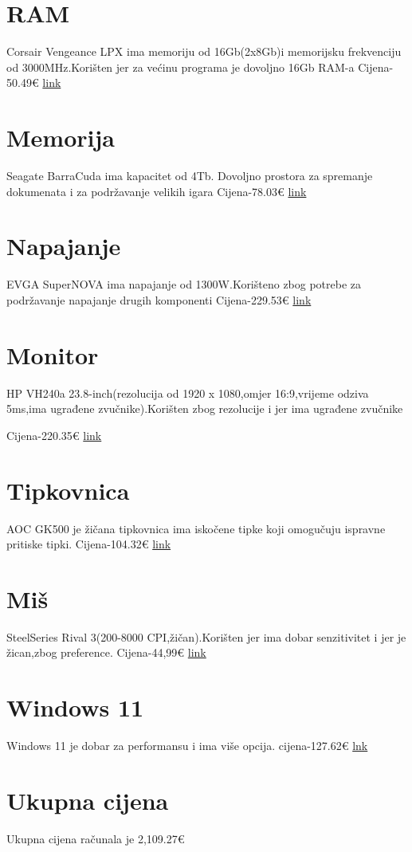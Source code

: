 \documentclass{article}
\begin{document}
\section{\huge{RAM}}
Corsair Vengeance LPX ima memoriju od 16Gb(2x8Gb)i memorijsku frekvenciju od 3000MHz.Korišten jer za većinu programa je dovoljno 16Gb RAM-a
Cijena-50.49€
\href{https://www.corsair.com/eu/en/p/memory/cmk16gx4m2b3200c16/vengeancea-lpx-16gb-2-x-8gb-ddr4-dram-3200mhz-c16-memory-kit-black-cmk16gx4m2b3200c16}{link}

\section{\huge{Memorija}}
Seagate BarraCuda ima kapacitet od 4Tb. Dovoljno prostora za spremanje dokumenata i za podržavanje velikih igara
Cijena-78.03€
\href{https://www.amazon.com/Seagate-Barracuda-Internal-3-5-Inch-ST4000DM004/dp/B071WLPRHN}{link}



\section{\huge{Napajanje}}
EVGA SuperNOVA ima napajanje od 1300W.Korišteno zbog potrebe za podržavanje napajanje drugih komponenti
Cijena-229.53€   \href{https://www.evga.com/products/productlist.aspx?type=10}{link}


\section{\huge{Monitor}}

HP VH240a 23.8-inch(rezolucija od 1920 x 1080,omjer 16:9,vrijeme odziva 5ms,ima ugrađene zvučnike).Korišten zbog rezolucije i jer ima ugrađene zvučnike


Cijena-220.35€ \href{https://www.amazon.com/HP-23-8-inch-Adjustment-Speakers-VH240a/dp/B072M34RQC}{link}

\section{\huge{Tipkovnica}}
AOC GK500 je žičana tipkovnica ima  iskočene tipke koji omogučuju ispravne pritiske tipki.
Cijena-104.32€ \href{https://www.amazon.com.au/AOC-GK500-Gaming-Keyboard-Anti-Ghosting/dp/B089VRTWDG}{link}

\section{\huge{Miš}}
SteelSeries Rival 3(200-8000 CPI,žičan).Korišten jer ima dobar senzitivitet i jer je žican,zbog preference.
Cijena-44,99€ 
\href{https://www.links.hr/hr/mis-steelseries-rival-3-opticki-rgb-8500-cpi-mat-crni-usb-101500564}{link}

\section{\huge{Windows 11}}
Windows 11 je dobar za performansu i ima više opcija.
cijena-127.62€  
\href{https://www.microsoft.com/en-us/d/windows-11-home/dg7gmgf0krt0/000P}{lnk}
\section{\huge{Ukupna cijena}}
Ukupna cijena računala je 2,109.27€ 
\end{document}
